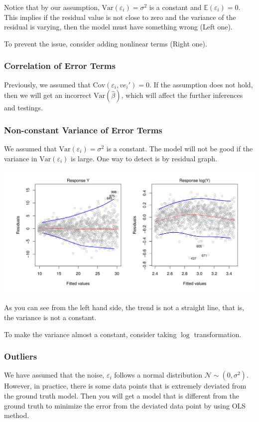 \documentclass{article}
\theoremstyle{MyNonumberplain}
\theoremstyle{break}
\newcommand{\ve}{\varepsilon}
\newcommand{\ev}{\mathbb{E}}
\newcommand{\var}{\text{Var}}
\newcommand{\cov}{\text{Cov}}
\theoremstyle{break}
\begin{document}
Notice that by our assumption, $\var(\ve_i)=\sigma^2$ is a constant and $\ev(\ve_i)=0$. 
This implies if the residual value is not close to zero and the variance of the residual is varying, then the model must have something wrong (Left one).

To prevent the issue, consider adding nonlinear terms (Right one).

\subsubsection{Correlation of Error Terms}

Previously, we assumed that $\cov(\ve_i,ve_i')=0$. 
If the assumption does not hold, then we will get an incorrect $\var(\hat\beta)$, which will affect the further inferences and testings.

\subsubsection{Non-constant Variance of Error Terms}

We assumed that $\var(\ve_i)=\sigma^2$ is a constant. The model will not be good if the variance in $\var(\ve_i)$ is large. 
One way to detect is by residual graph. 

\includegraphics[scale=0.2]{Images/img11.png}

As you can see from the left hand side, the trend is not a straight line, that is, the variance is not a constant.

To make the variance almost a constant, consider taking $\log$ transformation.

\subsubsection{Outliers}

We have assumed that the noise, $\ve_i$ follows a normal distribution $\mathcal{N}\sim (0,\sigma^2)$.
However, in practice, there is some data points that is extremely deviated from the ground truth model. 
Then you will get a model that is different from the ground truth to minimize the error from the deviated data point by using OLS method.
\end{document}
